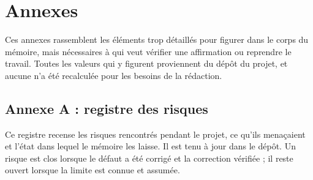 \chapter*{Annexes}

Ces annexes rassemblent les éléments trop détaillés pour figurer dans le corps du mémoire, mais
nécessaires à qui veut vérifier une affirmation ou reprendre le travail. Toutes les valeurs qui y
figurent proviennent du dépôt du projet, et aucune n'a été recalculée pour les besoins de la
rédaction.

\section*{Annexe A : registre des risques}
\renewcommand{\thetable}{A.\arabic{table}}
\setcounter{table}{0}

Ce registre recense les risques rencontrés pendant le projet, ce qu'ils menaçaient et l'état dans
lequel le mémoire les laisse. Il est tenu à jour dans le dépôt. Un risque est clos lorsque le
défaut a été corrigé et la correction vérifiée ; il reste ouvert lorsque la limite est connue et
assumée.

